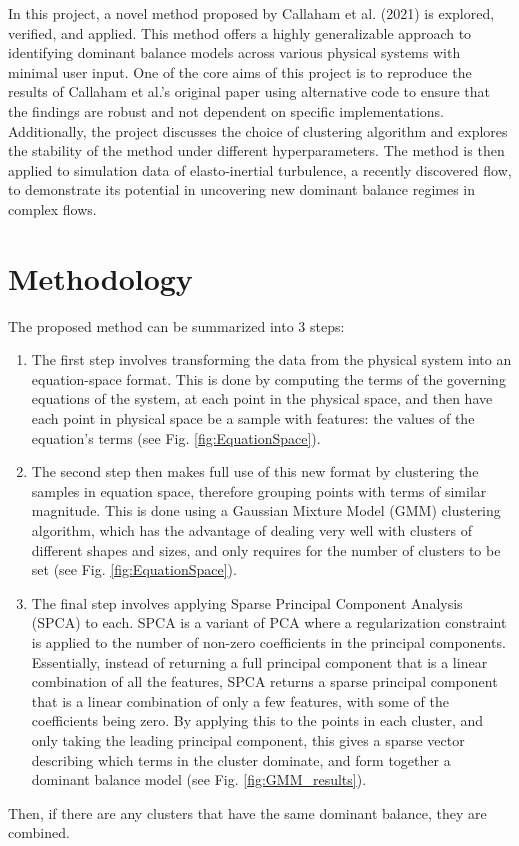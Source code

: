 \documentclass[12pt]{report} %
\begin{document}
\vspace{5mm}

In this project, a novel method proposed by Callaham et al. (2021)\cite{callaham2021learning} is explored, verified, and applied. This method offers a highly generalizable approach to identifying dominant balance models across various physical systems with minimal user input. One of the core aims of this project is to reproduce the results of Callaham et al.’s original paper using alternative code to ensure that the findings are robust and not dependent on specific implementations. Additionally, the project discusses the choice of clustering algorithm and explores the stability of the method under different hyperparameters. The method is then applied to simulation data of elasto-inertial turbulence\cite{Samanta2012eit}, a recently discovered flow, to demonstrate its potential in uncovering new dominant balance regimes in complex flows.


\section{Methodology}

The proposed method can be summarized into 3 steps:
\begin{enumerate}
  \item The first step involves transforming the data from the physical system into an equation-space format. This is done by computing the terms of the governing equations of the system, at each point in the physical space, and then have each point in physical space be a sample with features: the values of the equation's terms (see Fig. \ref{fig:EquationSpace}).
  \item The second step then makes full use of this new format by clustering the samples in equation space, therefore grouping points with terms of similar magnitude. This is done using a Gaussian Mixture Model (GMM) clustering algorithm, which has the advantage of dealing very well with clusters of different shapes and sizes, and only requires for the number of clusters to be set (see Fig. \ref{fig:EquationSpace}).
  \item The final step involves applying Sparse Principal Component Analysis (SPCA) to each. SPCA is a variant of PCA where a regularization constraint is applied to the number of non-zero coefficients in the principal components. Essentially, instead of returning a full principal component that is a linear combination of all the features, SPCA returns a sparse principal component that is a linear combination of only a few features, with some of the coefficients being zero. By applying this to the points in each cluster, and only taking the leading principal component, this gives a sparse vector describing which terms in the cluster dominate, and form together a dominant balance model (see Fig. \ref{fig:GMM_results}).
\end{enumerate}
Then, if there are any clusters that have the same dominant balance, they are combined.
\end{document}
